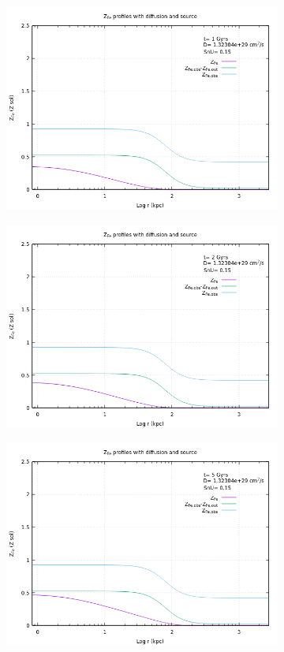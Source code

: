 \documentclass{article}
\begin{document}
\begin{figure}[H]
	\begin{subfigure}{0.49\textwidth}
		\includegraphics[width=0.9\linewidth]{Z_diffsource_1.png}
	\end{subfigure}
	\begin{subfigure}{0.49\textwidth}
		\includegraphics[width=0.9\linewidth]{Z_diffsource_2.png}
	\end{subfigure}
	\begin{subfigure}{0.49\textwidth}
		\includegraphics[width=0.9\linewidth]{Z_diffsource_5.png}

\end{subfigure}
\end{figure}
\end{document}
